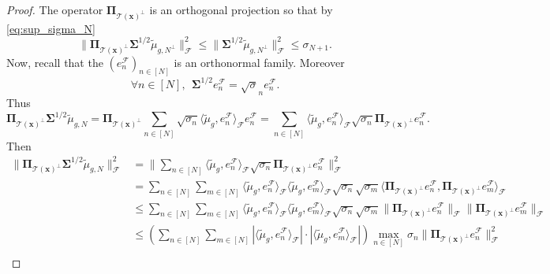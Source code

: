 \documentclass[twoside,11pt]{book}
\numberwithin{theorem}{chapter}
\numberwithin{definition}{chapter}
\numberwithin{proposition}{chapter}
\numberwithin{corollary}{chapter}
\numberwithin{example}{chapter}
\numberwithin{lemma}{chapter}
\numberwithin{assumption}{chapter}
\DeclareMathOperator{\F}{\mathcal{F}}
\begin{document}
\begin{proof}
The operator $\bm{\Pi}_{\mathcal{T}(\bm{x})^{\perp}}$ is an orthogonal projection so that by \eqref{eq:sup_sigma_N}
%
\begin{equation}
\| \bm{\Pi}_{\mathcal{T}(\bm{x})^{\perp}}\bm{\Sigma}^{1/2} \tilde{\mu}_{g,N^{\perp}}\| _{\mathcal{F}}^{2} \leq \| \bm{\Sigma}^{1/2} \tilde{\mu}_{g,N^{\perp}}\| _{\mathcal{F}}^{2} \leq \sigma_{N+1}.
\end{equation}
Now, recall that the $(e_{n}^{\mathcal{F}})_{n \in [N]}$ is an orthonormal family. Moreover
\begin{equation}
\forall n \in [N], \:\: \bm{\Sigma}^{1/2}e_{n}^{\F} = \sqrt{\sigma}_{n} e_{n}^{\F}.
\end{equation}
 Thus
 \begin{equation}
\bm{\Pi}_{\mathcal{T}(\bm{x})^{\perp}}\bm{\Sigma}^{1/2}\tilde{\mu}_{g,N} = \bm{\Pi}_{\mathcal{T}(\bm{x})^{\perp}}\sum\limits_{n \in [N]} \sqrt{\sigma_{n}} \langle \tilde{\mu}_{g}, e_{n}^{\mathcal{F}} \rangle_{\mathcal{F}} e_{n}^{\mathcal{F}} = \sum\limits_{n \in [N]} \langle \tilde{\mu}_{g}, e_{n}^{\mathcal{F}} \rangle_{\mathcal{F}} \sqrt{\sigma_{n}} \bm{\Pi}_{\mathcal{T}(\bm{x})^{\perp}}e_{n}^{\mathcal{F}}.
\end{equation}
Then
\begin{align}
    \|\bm{\Pi}_{\mathcal{T}(\bm{x})^{\perp}}\bm{\Sigma}^{1/2} \tilde{\mu}_{g,N}\|_{\mathcal{F}}^{2} & = \| \sum\limits_{n \in [N]} \langle \tilde{\mu}_{g}, e_{n}^{\mathcal{F}} \rangle_{\mathcal{F}} \sqrt{\sigma_{n}} \bm{\Pi}_{\mathcal{T}(\bm{x})^{\perp}}e_{n}^{\mathcal{F}} \|_{\mathcal{F}}^{2}\\
    & = \sum\limits_{n \in [N]} \sum\limits_{m \in [N]}\langle \tilde{\mu}_{g}, e_{n}^{\mathcal{F}} \rangle_{\mathcal{F}} \langle \tilde{\mu}_{g}, e_{m}^{\mathcal{F}} \rangle_{\mathcal{F}} \sqrt{\sigma_{n}}\sqrt{\sigma_{m}}  \langle  \bm{\Pi}_{\mathcal{T}(\bm{x})^{\perp}}e_{n}^{\mathcal{F}}, \bm{\Pi}_{\mathcal{T}(\bm{x})^{\perp}}e_{m}^{\mathcal{F}}\rangle_{\mathcal{F}} \nonumber\\
    & \leq \sum\limits_{n \in [N]} \sum\limits_{m \in [N]}\langle \tilde{\mu}_{g}, e_{n}^{\mathcal{F}} \rangle_{\mathcal{F}} \langle \tilde{\mu}_{g}, e_{m}^{\mathcal{F}} \rangle_{\mathcal{F}} \sqrt{\sigma_{n}}\sqrt{\sigma_{m}}   \|\bm{\Pi}_{\mathcal{T}(\bm{x})^{\perp}}e_{n}^{\mathcal{F}}\|_{\mathcal{F}}\|\bm{\Pi}_{\mathcal{T}(\bm{x})^{\perp}}e_{m}^{\mathcal{F}}\|_{\mathcal{F}} \nonumber\\
    & \leq \left( \sum\limits_{n \in [N]} \sum\limits_{m \in [N]} |\langle \tilde{\mu}_{g}, e_{n}^{\mathcal{F}} \rangle_{\mathcal{F}}|\cdot | \langle \tilde{\mu}_{g}, e_{m}^{\mathcal{F}} \rangle_{\mathcal{F}}| \right) \max\limits_{n \in [N]}\sigma_{n}  \|\bm{\Pi}_{\mathcal{T}(\bm{x})^{\perp}}e_{n}^{\mathcal{F}}\|_{\mathcal{F}}^{2} \nonumber\\

\end{align}
\end{proof}
\end{document}
